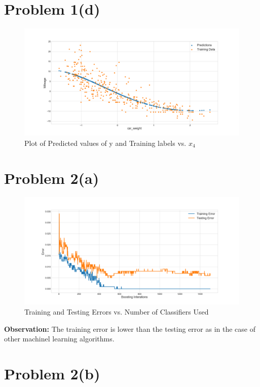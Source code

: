 \documentclass[openany,11pt]{homework}
\begin{document}
\section*{Problem 1(d)}
\begin{figure}[h]
	\centering
	\includegraphics[width = \textwidth]{Homework_3_export/1d_new.png}
	\caption{Plot of Predicted values of y and Training labels vs. $x_4$}
\end{figure}

\section*{Problem 2(a)}

\begin{figure}[h]
	\centering
	\includegraphics[width = \textwidth]{Homework_3_export/2a.png}
	\caption{Training and Testing Errors vs. Number of Classifiers Used}
\end{figure}

\textbf{Observation:} The training error is lower than the testing error as in the case of other machinel learning algorithms. 

\section*{Problem 2(b)}
\end{document}
